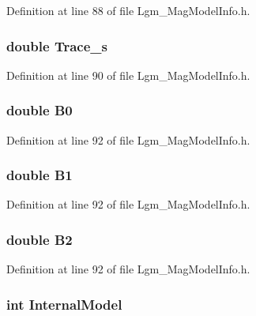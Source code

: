 Definition at line 88 of file Lgm\_\-MagModelInfo.h.\hypertarget{struct_lgm___mag_model_info_d543ac40b07dbe5a76060b7f56b90094}{
\subsubsection[{Trace\_\-s}]{\setlength{\rightskip}{0pt plus 5cm}double {\bf Trace\_\-s}}}
\label{struct_lgm___mag_model_info_d543ac40b07dbe5a76060b7f56b90094}




Definition at line 90 of file Lgm\_\-MagModelInfo.h.\hypertarget{struct_lgm___mag_model_info_f8c1a0342c71ca07cc809e7e808ec81e}{
\subsubsection[{B0}]{\setlength{\rightskip}{0pt plus 5cm}double {\bf B0}}}
\label{struct_lgm___mag_model_info_f8c1a0342c71ca07cc809e7e808ec81e}




Definition at line 92 of file Lgm\_\-MagModelInfo.h.\hypertarget{struct_lgm___mag_model_info_612bfe392d6bf2d2e1a2f6e65a003f5e}{
\subsubsection[{B1}]{\setlength{\rightskip}{0pt plus 5cm}double {\bf B1}}}
\label{struct_lgm___mag_model_info_612bfe392d6bf2d2e1a2f6e65a003f5e}




Definition at line 92 of file Lgm\_\-MagModelInfo.h.\hypertarget{struct_lgm___mag_model_info_c25028524f0b3bb1e35a6f5b62bc4f47}{
\subsubsection[{B2}]{\setlength{\rightskip}{0pt plus 5cm}double {\bf B2}}}
\label{struct_lgm___mag_model_info_c25028524f0b3bb1e35a6f5b62bc4f47}




Definition at line 92 of file Lgm\_\-MagModelInfo.h.\hypertarget{struct_lgm___mag_model_info_02a6418c4d27275421dd73a5bbb65f8c}{
\subsubsection[{InternalModel}]{\setlength{\rightskip}{0pt plus 5cm}int {\bf InternalModel}}}
\label{struct_lgm___mag_model_info_02a6418c4d27275421dd73a5bbb65f8c}




